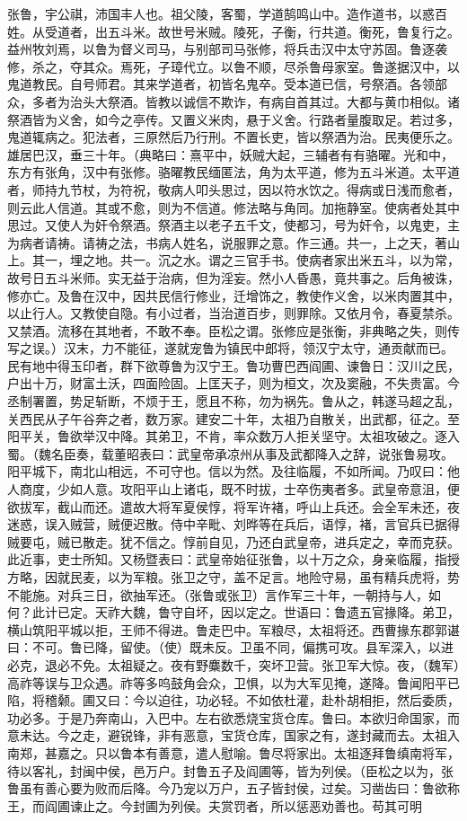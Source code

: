 张鲁，宇公祺，沛国丰人也。祖父陵，客蜀，学道鹄鸣山中。造作道书，以惑百姓。从受道者，出五斗米。故世号米贼。陵死，子衡，行共道。衡死，鲁复行之。益州牧刘焉，以鲁为督义司马，与别部司马张修，将兵击汉中太守苏固。鲁逐袭修，杀之，夺其众。焉死，子璋代立。以鲁不顺，尽杀鲁母家室。鲁遂据汉中，以鬼道教民。自号师君。其来学道者，初皆名鬼卒。受本道已信，号祭酒。各领部众，多者为治头大祭酒。皆教以诚信不欺诈，有病自首其过。大都与黄巾相似。诸祭酒皆为义舍，如今之亭传。又置义米肉，悬于义舍。行路者量腹取足。若过多，鬼道辄病之。犯法者，三原然后乃行刑。不置长吏，皆以祭酒为治。民夷便乐之。雄居巴汉，垂三十年。（典略曰：熹平中，妖贼大起，三辅者有有骆曜。光和中，东方有张角，汉中有张修。骆曜教民缅匿法，角为太平道，修为五斗米道。太平道者，师持九节杖，为符祝，敬病人叩头思过，因以符水饮之。得病或日浅而愈者，则云此人信道。其或不愈，则为不信道。修法略与角同。加拖静室。使病者处其中思过。又使人为奸令祭酒。祭酒主以老子五千文，使都习，号为奸令，以鬼吏，主为病者请祷。请祷之法，书病人姓名，说服罪之意。作三通。共一，上之天，著山上。其一，埋之地。共一。沉之水。谓之三官手书。使病者家出米五斗，以为常，故号日五斗米师。实无益于治病，但为淫妄。然小人昏愚，竟共事之。后角被诛，修亦亡。及鲁在汉中，因共民信行修业，迁增饰之，教使作义舍，以米肉置其中，以止行人。又教使自隐。有小过者，当治道百步，则罪除。又依月令，春夏禁杀。又禁酒。流移在其地者，不敢不奉。臣松之谓。张修应是张衡，非典略之失，则传写之误。）汉末，力不能征，遂就宠鲁为镇民中郎将，领汉宁太守，通贡献而已。民有地中得玉印者，群下欲尊鲁为汉宁王。鲁功曹巴西阎圃、谏鲁日：汉川之民，户出十万，财富土沃，四面险固。上匡天子，则为桓文，次及窦融，不失贵富。今丞制署置，势足斩断，不烦于王，愿且不称，勿为祸先。鲁从之，韩遂马超之乱，关西民从子午谷奔之者，数万家。建安二十年，太祖乃自散关，出武都，征之。至阳平关，鲁欲举汉中降。其弟卫，不肯，率众数万人拒关坚守。太祖攻破之。逐入蜀。（魏名臣奏，载董昭表曰：武皇帝承凉州从事及武都降入之辞，说张鲁易攻。阳平城下，南北山相远，不可守也。信以为然。及往临履，不如所闻。乃叹曰：他人商度，少如人意。攻阳平山上诸屯，既不时拔，士卒伤夷者多。武皇帝意沮，便欲拔军，截山而还。遣故大将军夏侯惇，将军许褚，呼山上兵还。会全军未还，夜迷惑，误入贼营，贼便迟散。侍中辛毗、刘晔等在兵后，语惇，褚，言官兵已据得贼要屯，贼已散走。犹不信之。惇前自见，乃还白武皇帝，进兵定之，幸而克获。此近事，吏士所知。又杨暨表曰：武皇帝始征张鲁，以十万之众，身亲临履，指授方略，因就民麦，以为军粮。张卫之守，盖不足言。地险守易，虽有精兵虎将，势不能施。对兵三日，欲抽军还。（张鲁或张卫）言作军三十年，一朝持与人，如何？此计已定。天祚大魏，鲁守自坏，因以定之。世语曰：鲁遗五官掾降。弟卫，横山筑阳平城以拒，王师不得进。鲁走巴中。军粮尽，太祖将还。西曹掾东郡郭谌曰：不可。鲁已降，留使。（使）既未反。卫虽不同，偏携可攻。县军深入，以进必克，退必不免。太祖疑之。夜有野麋数千，突坏卫营。张卫军大惊。夜，（魏军）高祚等误与卫众遇。祚等多呜鼓角会众，卫惧，以为大军见掩，遂降。鲁闻阳平已陷，将稽颡。圃又曰：今以迫往，功必轻。不如依杜灌，赴朴胡相拒，然后委质，功必多。于是乃奔南山，入巴中。左右欲悉烧宝货仓库。鲁曰。本欲归命国家，而意未达。今之走，避锐锋，非有恶意，宝货仓库，国家之有，遂封藏而去。太祖入南郑，甚嘉之。只以鲁本有善意，遣人慰喻。鲁尽将家出。太祖逐拜鲁缜南将军，待以客礼，封闽中侯，邑万户。封鲁五子及阎圃等，皆为列侯。（臣松之以为，张鲁虽有善心要为败而后降。今乃宠以万户，五子皆封侯，过矣。习凿齿曰：鲁欲称王，而阎圃谏止之。今封圃为列侯。夫赏罚者，所以惩恶劝善也。苟其可明